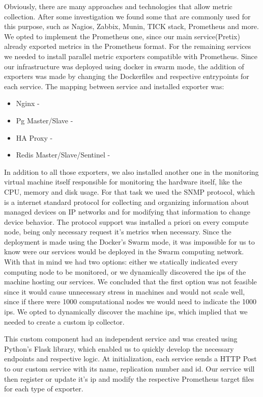 \documentclass[12pt]{article}
\begin{document}
Obviously, there are many approaches and technologies that allow metric collection. After some investigation we found some that are commonly used for this purpose, such as Nagios, Zabbix, Munin, TICK stack, Prometheus and more. We opted to implement the Prometheus one, since our main service(Pretix) already exported metrics in the Prometheus format. For the remaining services we needed to install parallel metric exporters compatible with Prometheus. Since our infrastructure was deployed using docker in swarm mode, the addition of exporters was made by changing the Dockerfiles and respective entrypoints for each service. The mapping between service and installed exporter was:

\begin{itemize}
  \item Nginx - 
  \item Pg Master/Slave - 
  \item HA Proxy - 
  \item Redis Master/Slave/Sentinel - 
\end{itemize}

In addition to all those exporters, we also installed another one in the monitoring virtual machine itself responsible for monitoring the hardware itself, like the CPU, memory and disk usage. For that task we used the SNMP protocol, which is a internet standard protocol for collecting and organizing information about managed devices on IP networks and for modifying that information to change device behavior. The protocol support was installed a priori on every compute node, being only necessary request it's metrics when necessary. Since the deployment is made using the Docker's Swarm mode, it was impossible for us to know were our services would be deployed in the Swarm computing network. With that in mind we had two options: either we statically indicated every computing node to be monitored, or we dynamically discovered the ips of the machine hosting our services. We concluded that the first option was not feasible since it would cause unnecessary stress in machines and would not scale well, since if there were 1000 computational nodes we would need to indicate the 1000 ips. We opted to dynamically discover the machine ips, which implied that we needed to create a custom ip collector.

This custom component had an independent service and was created using Python's Flask library, which enabled us to quickly develop the necessary endpoints and respective logic. At initialization, each service sends a HTTP Post to our custom service with its name, replication number and id. Our service will then register or update it's ip and modify the respective Prometheus target files for each type of exporter.
\end{document}
